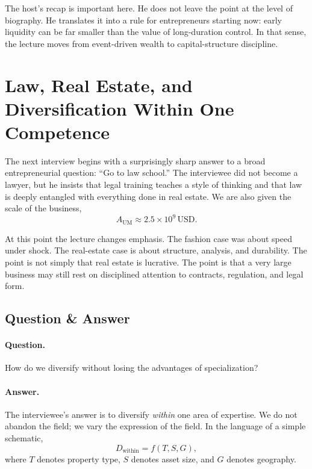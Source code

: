 The host's recap is important here. He does not leave the point at the level of biography. He translates it into a rule for entrepreneurs starting now: early liquidity can be far smaller than the value of long-duration control. In that sense, the lecture moves from event-driven wealth to capital-structure discipline.

\section{Law, Real Estate, and Diversification Within One Competence}

The next interview begins with a surprisingly sharp answer to a broad entrepreneurial question: ``Go to law school.'' The interviewee did not become a lawyer, but he insists that legal training teaches a style of thinking and that law is deeply entangled with everything done in real estate. We are also given the scale of the business,
\begin{equation}
A_{\mathrm{UM}} \approx 2.5\times 10^9 \,\mathrm{USD}.
\end{equation}

At this point the lecture changes emphasis. The fashion case was about speed under shock. The real-estate case is about structure, analysis, and durability. The point is not simply that real estate is lucrative. The point is that a very large business may still rest on disciplined attention to contracts, regulation, and legal form.

\subsection{Question \& Answer}

\paragraph{Question.} How do we diversify without losing the advantages of specialization?

\paragraph{Answer.} The interviewee's answer is to diversify \emph{within} one area of expertise. We do not abandon the field; we vary the expression of the field. In the language of a simple schematic,
\begin{equation}
D_{\mathrm{within}} = f(T,S,G),
\end{equation}
where \(T\) denotes property type, \(S\) denotes asset size, and \(G\) denotes geography.

